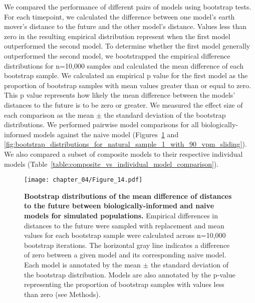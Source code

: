 We compared the performance of different pairs of models using bootstrap tests.
For each timepoint, we calculated the difference between one model's earth mover's distance to the future and the other model's distance.
Values less than zero in the resulting empirical distribution represent when the first model outperformed the second model.
To determine whether the first model generally outperformed the second model, we bootstrapped the empirical difference distributions for n=10,000 samples and calculated the mean difference of each bootstrap sample.
We calculated an empirical p value for the first model as the proportion of bootstrap samples with mean values greater than or equal to zero.
This p value represents how likely the mean difference between the models' distances to the future is to be zero or greater.
We measured the effect size of each comparison as the mean $\pm$ the standard deviation of the bootstrap distributions.
We performed pairwise model comparisons for all biologically-informed models against the naive model (Figures~\ref{fig:bootstrap_distributions_for_simulated_sample_3} and \ref{fig:bootstrap_distributions_for_natural_sample_1_with_90_vpm_sliding}).
We also compared a subset of composite models to their respective individual models (Table~\ref{table:composite_vs_individual_model_comparison}).

\begin{figure}
  \begin{center}
  \texttt{[image: chapter\_04/Figure\_14.pdf]}
  \caption[{Bootstrap distributions of the mean difference of distances to the future between biologically-informed and naive models for simulated populations.}]{
  {\bf Bootstrap distributions of the mean difference of distances to the future between biologically-informed and naive models for simulated populations.}
  Empirical differences in distances to the future were sampled with replacement and mean values for each bootstrap sample were calculated across n=10,000 bootstrap iterations.
  The horizontal gray line indicates a difference of zero between a given model and its corresponding naive model.
  Each model is annotated by the mean $\pm$ the standard deviation of the bootstrap distribution.
  Models are also annotated by the p-value representing the proportion of bootstrap samples with values less than zero (see Methods).
  }
  \label{fig:bootstrap_distributions_for_simulated_sample_3}
  \end{center}
\end{figure}

